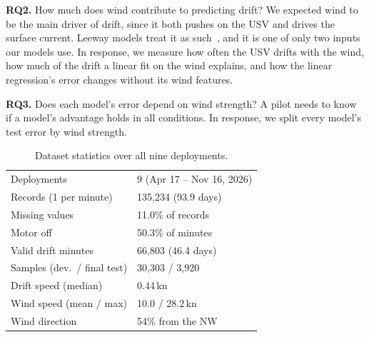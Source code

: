 \documentclass[sigconf]{acmart}
\begin{document}
\noindent\textbf{RQ2.} How much does wind contribute to predicting drift? We expected wind to be the main driver of drift, since it both pushes on the USV and drives the surface current.
Leeway models treat it as such~\cite{breivik2011leeway}, and it is one of only two inputs our models use. In response, we measure how often the USV drifts with the wind, how much of the drift a linear fit on the wind explains, and how the linear regression's error changes without its wind features.




\noindent\textbf{RQ3.} Does each model's error depend on wind strength? A pilot needs to know if a model's advantage holds in all conditions. In response, we split every model's test error by wind strength.

\begin{table}[t]
\centering\footnotesize
\caption{Dataset statistics over all nine deployments.}
\label{tab:dataset}
\begin{tabular}{@{}ll@{}}
\toprule
Deployments            & 9 (Apr 17 -- Nov 16, 2026) \\
Records (1 per minute) & 135{,}234 (93.9 days) \\
Missing values         & 11.0\% of records \\
Motor off              & 50.3\% of minutes \\
Valid drift minutes    & 66{,}803 (46.4 days) \\
Samples (dev.\ / final test) & 30{,}303 / 3{,}920 \\
Drift speed (median)   & 0.44\,kn \\
Wind speed (mean / max)& 10.0 / 28.2\,kn \\
Wind direction         & 54\% from the NW \\
\bottomrule
\end{tabular}
\end{table}
\end{document}
